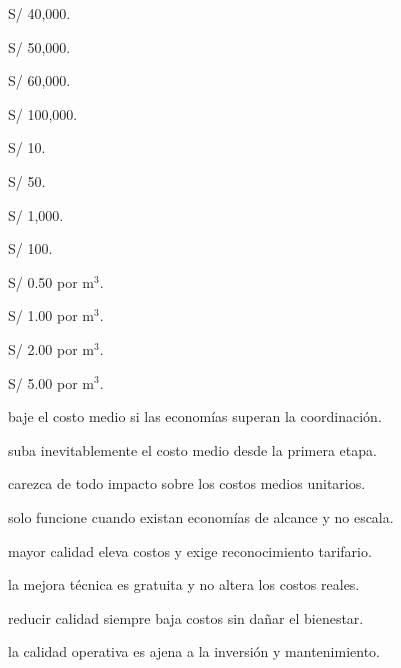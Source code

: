 \begin{opts}
    \item S/ 40,000.
    \item S/ 50,000.
    \item S/ 60,000.
    \item S/ 100,000.
\end{opts}

\begin{opts}
    \item S/ 10.
    \item S/ 50.
    \item S/ 1,000.
    \item S/ 100.
\end{opts}

\begin{opts}
    \item S/ 0.50 por m$^3$.
    \item S/ 1.00 por m$^3$.
    \item S/ 2.00 por m$^3$.
    \item S/ 5.00 por m$^3$.
\end{opts}

\begin{opts}
    \item baje el costo medio si las economías superan la coordinación.
    \item suba inevitablemente el costo medio desde la primera etapa.
    \item carezca de todo impacto sobre los costos medios unitarios.
    \item solo funcione cuando existan economías de alcance y no escala.
\end{opts}

\begin{opts}
    \item mayor calidad eleva costos y exige reconocimiento tarifario.
    \item la mejora técnica es gratuita y no altera los costos reales.
    \item reducir calidad siempre baja costos sin dañar el bienestar.
    \item la calidad operativa es ajena a la inversión y mantenimiento.
\end{opts}

